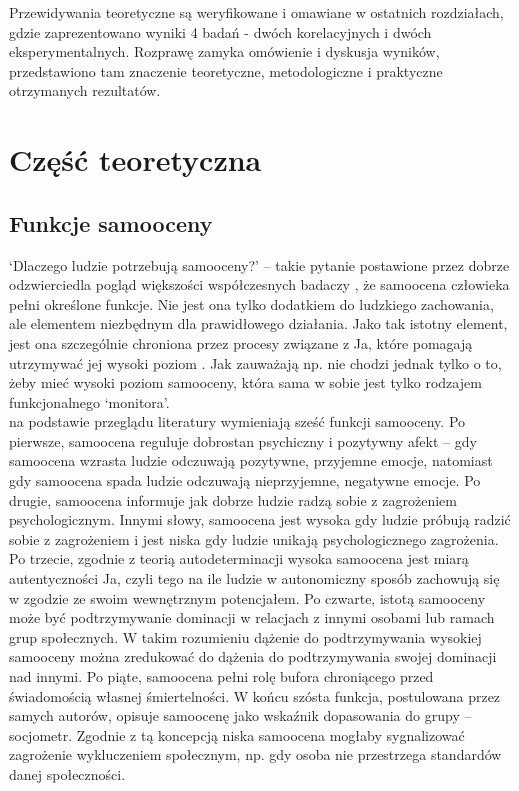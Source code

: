 \documentclass[man]{apa6}
\begin{document}
Przewidywania teoretyczne są weryfikowane i omawiane w ostatnich rozdziałach, gdzie zaprezentowano wyniki 4 badań - dwóch korelacyjnych i dwóch eksperymentalnych. Rozprawę zamyka omówienie i dyskusja wyników, przedstawiono tam znaczenie teoretyczne, metodologiczne i praktyczne otrzymanych rezultatów. \\

\newpage
\section{Część teoretyczna}
\subsection{Funkcje samooceny}

`Dlaczego ludzie potrzebują samooceny?' -- takie pytanie postawione przez \textcite{pyszczynski2004people} dobrze odzwierciedla pogląd większości współczesnych badaczy \parencite[zob. również, ][]{bandura1994self, leary1995self}, że samoocena człowieka pełni określone funkcje. Nie jest ona tylko dodatkiem do ludzkiego zachowania, ale elementem niezbędnym dla prawidłowego działania. Jako tak istotny element, jest ona szczególnie chroniona przez procesy związane z Ja, które pomagają utrzymywać jej wysoki poziom \parencite{greenwald1980totalitarian}. Jak zauważają np. \textcite{leary2000nature} nie chodzi jednak tylko o to, żeby mieć wysoki poziom samooceny, która sama w sobie jest tylko rodzajem funkcjonalnego `monitora'.\\

\textcite{leary2000nature} na podstawie przeglądu literatury wymieniają sześć funkcji samooceny. Po pierwsze, samoocena reguluje dobrostan psychiczny i pozytywny afekt -- gdy samoocena wzrasta ludzie odczuwają pozytywne, przyjemne emocje, natomiast gdy samoocena spada ludzie odczuwają nieprzyjemne, negatywne emocje. Po drugie, samoocena informuje jak dobrze ludzie radzą sobie z zagrożeniem psychologicznym. Innymi słowy, samoocena jest wysoka gdy ludzie próbują radzić sobie z zagrożeniem i jest niska gdy ludzie unikają psychologicznego zagrożenia. Po trzecie, zgodnie z teorią autodeterminacji \parencite{deci2000and} wysoka samoocena jest miarą autentyczności Ja, czyli tego na ile ludzie w autonomiczny sposób zachowują się w zgodzie ze swoim wewnętrznym potencjałem. Po czwarte, istotą samooceny może być podtrzymywanie dominacji w relacjach z innymi osobami lub ramach grup społecznych. W takim rozumieniu dążenie do podtrzymywania wysokiej samooceny można zredukować do dążenia do podtrzymywania swojej dominacji nad innymi. Po piąte, samoocena pełni rolę bufora chroniącego przed świadomością własnej śmiertelności. W końcu szósta funkcja, postulowana przez samych autorów, opisuje samoocenę jako wskaźnik dopasowania do grupy -- socjometr. Zgodnie z tą koncepcją niska samoocena mogłaby sygnalizować zagrożenie wykluczeniem społecznym, np. gdy osoba nie przestrzega standardów danej społeczności.\\
\end{document}
